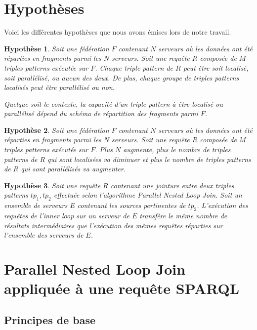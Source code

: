 \documentclass[a4paper]{article}
\def\sparql{\textsc{SPARQL}\xspace}
\newtheorem{hypo}{Hypothèse}
\begin{document}
\section{Hypothèses}

Voici les différentes hypothèses que nous avons émises lors de notre travail.

\begin{hypo}\label{hypo:localityANDparallel}
Soit une fédération $F$ contenant $N$ serveurs où les données ont été réparties en fragments parmi les $N$ serveurs. Soit une requête $R$ composée de $M$ triples patterns exécutée sur $F$. Chaque triple pattern de $R$ peut être soit localisé, soit parallélisé, ou aucun des deux. De plus, chaque groupe de triples patterns localisés peut être parallélisé ou non. 

Quelque soit le contexte, la capacité d'un triple pattern à être localisé ou parallélisé dépend du schéma de répartition des fragments parmi $F$.
\end{hypo}

\begin{hypo}\label{hypo:localityVSparallel}
Soit une fédération $F$ contenant $N$ serveurs où les données ont été réparties en fragments parmi les $N$ serveurs. Soit une requête $R$ composée de $M$ triples patterns exécutée sur $F$. Plus $N$ augmente, plus le nombre de triples patterns de $R$ qui sont localisées va diminuer et plus le nombre de triples patterns de $R$ qui sont parallélisés va augmenter. 
\end{hypo}

\begin{hypo}\label{hypo:stableTuples}
Soit une requête $R$ contenant une jointure entre deux triples patterns $tp_1, tp_2$ effectuée selon l'algorithme Parallel Nested Loop Join. Soit un ensemble de serveurs $E$ contenant les sources pertinentes de $tp_2$. L'exécution des requêtes de l'inner loop sur un serveur de $E$ transfère le même nombre de résultats intermédiaires que l'exécution des mêmes requêtes réparties sur l'ensemble des serveurs de $E$.
\end{hypo}

\section{Parallel Nested Loop Join appliquée à une requête \sparql}

\subsection{Principes de base}
\end{document}
